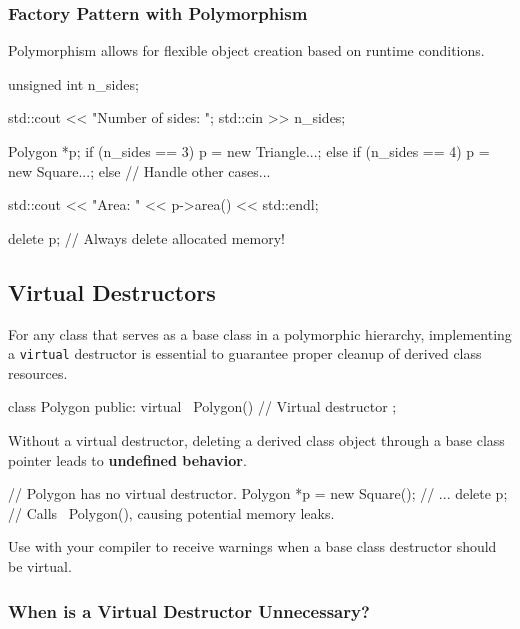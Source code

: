 \subsubsection{Factory Pattern with Polymorphism}

Polymorphism allows for flexible object creation based on runtime conditions.

\begin{codeblock}[language=C++]
unsigned int n_sides;

std::cout << "Number of sides: ";
std::cin >> n_sides;

Polygon *p;
if (n_sides == 3)
    p = new Triangle{...};
else if (n_sides == 4)
    p = new Square{...};
else {
    // Handle other cases...
}

std::cout << "Area: " << p->area() << std::endl;

delete p; // Always delete allocated memory!
\end{codeblock}

\subsection{Virtual Destructors}

For any class that serves as a base class in a polymorphic hierarchy, implementing a \texttt{virtual} destructor is essential to guarantee proper cleanup of derived class resources.

\begin{codeblock}[language=C++, numbers=none]
class Polygon {
public:
    virtual ~Polygon() {} // Virtual destructor
};
\end{codeblock}

Without a virtual destructor, deleting a derived class object through a base class pointer leads to \textbf{undefined behavior}.

\begin{codeblock}[language=C++, numbers=none]
// Polygon has no virtual destructor.
Polygon *p = new Square();
// ...
delete p; // Calls ~Polygon(), causing potential memory leaks.
\end{codeblock}

\begin{tipsblock}
    Use  with your compiler to receive warnings when a base class destructor should be virtual.
\end{tipsblock}

\subsubsection{When is a Virtual Destructor Unnecessary?}

